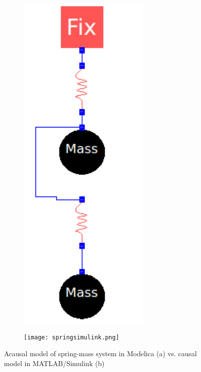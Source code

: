 \documentclass[letterpaper, 10 pt, conference]{ieeeconf}  %
\begin{document}
\begin{figure}
\centering
\begin{subfigure}[b]{0.09\textwidth}
    \includegraphics[width=0.7\textwidth]{twosprings.png}
  \caption{}
  \label{fig:twospringsmodelica}
\end{subfigure}
\begin{subfigure}[b]{0.38\textwidth}
    \texttt{[image: springsimulink.png]}
  \caption{}
  \label{fig:twospringssimulink}
\end{subfigure}
\caption{Acausal model of spring-mass system in Modelica (a) vs. causal model in MATLAB/Simulink (b)}
\label{fig:twosprings}
\end{figure}
\end{document}
